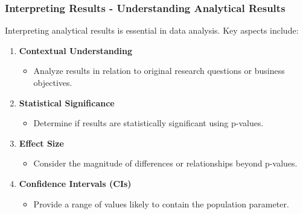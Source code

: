 \documentclass{beamer}
\begin{document}
\begin{frame}[fragile]
    \frametitle{Interpreting Results - Understanding Analytical Results}
    Interpreting analytical results is essential in data analysis. Key aspects include:
    \begin{enumerate}
        \item \textbf{Contextual Understanding}
        \begin{itemize}
            \item Analyze results in relation to original research questions or business objectives.
        \end{itemize}
        
        \item \textbf{Statistical Significance}
        \begin{itemize}
            \item Determine if results are statistically significant using p-values.
        \end{itemize}
        
        \item \textbf{Effect Size}
        \begin{itemize}
            \item Consider the magnitude of differences or relationships beyond p-values.
        \end{itemize}
        
        \item \textbf{Confidence Intervals (CIs)}
        \begin{itemize}
            \item Provide a range of values likely to contain the population parameter.
        \end{itemize}
    \end{enumerate}
\end{frame}
\end{document}
